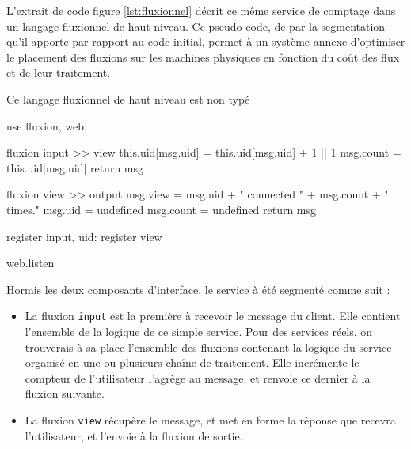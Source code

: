 L'extrait de code figure \ref{lst:fluxionnel} décrit ce même service de comptage dans un langage fluxionnel de haut niveau.
Ce pseudo code, de par la segmentation qu'il apporte par rapport au code initial, permet à un système annexe d'optimiser le placement des fluxions sur les machines physiques en fonction du coût des flux et de leur traitement.

Ce langage fluxionnel de haut niveau est non typé

\begin{code}[Javascript, caption={Code fluxionnel},label={lst:fluxionnel}]
use fluxion, web

fluxion input >> view
  this.uid[msg.uid] = this.uid[msg.uid] + 1 || 1
  msg.count = this.uid[msg.uid]
  return msg

fluxion view >> output
  msg.view = msg.uid + " connected " + msg.count + " times."
  msg.uid = undefined
  msg.count = undefined
  return msg

register input, {uid: {}}
register view

web.listen
\end{code}

Hormis les deux composants d'interface, le service à été segmenté comme suit :
\begin{itemize}
  \item La fluxion \texttt{input} est la première à recevoir le message du client.
  Elle contient l'ensemble de la logique de ce simple service.
  Pour des services réels, on trouverais à sa place l'ensemble des fluxions contenant la logique du service organisé en une ou plusieurs chaîne de traitement.
  Elle incrémente le compteur de l'utilisateur l'agrège au message, et renvoie ce dernier à la fluxion suivante.
  \item La fluxion \texttt{view} récupère le message, et met en forme la réponse que recevra l'utilisateur, et l'envoie à la fluxion de sortie.
\end{itemize}


